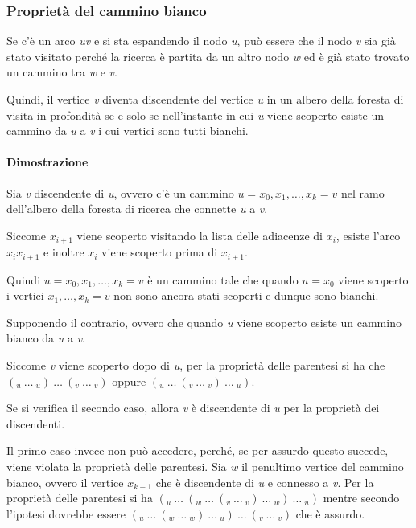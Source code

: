 \subsubsection{Proprietà del cammino bianco}\label{proprietuxe0-del-cammino-bianco}

Se c'è un arco \emph{uv} e si sta espandendo il nodo \emph{u}, può
essere che il nodo \emph{v} sia già stato visitato perché la ricerca è
partita da un altro nodo \emph{w} ed è già stato trovato un cammino tra
\emph{w} e \emph{v}.

Quindi, il vertice \emph{v} diventa discendente del vertice \emph{u} in
un albero della foresta di visita in profondità se e solo se
nell'instante in cui \emph{u} viene scoperto esiste un cammino da
\emph{u} a \emph{v} i cui vertici sono tutti bianchi.

\paragraph{Dimostrazione}\label{dimostrazione-2}

Sia \emph{v} discendente di \emph{u}, ovvero c'è un cammino $u = x_0, x_1, \ldots, x_k = v$ nel ramo dell'albero della foresta di ricerca
che connette \emph{u} a \emph{v}.

Siccome $x_{i+1}$ viene scoperto visitando la lista delle adiacenze di
$x_i$, esiste l'arco $x_ix_{i+1}$ e inoltre $x_i$ viene
scoperto prima di $x_{i+1}$.

Quindi $u = x_0, x_1,\ldots,x_k = v$ è un cammino tale che quando
$u = x_0$ viene scoperto i vertici $x_1,\ldots,x_k = v$ non
sono ancora stati scoperti e dunque sono bianchi.

Supponendo il contrario, ovvero che quando \emph{u} viene scoperto
esiste un cammino bianco da \emph{u} a \emph{v}.

Siccome \emph{v} viene scoperto dopo di \emph{u}, per la proprietà delle
parentesi si ha che  $(_u \: \ldots\: _u) \: \ldots \: (_v \:\ldots \:_v)$ oppure
$(_u \: \ldots \: (_v \: \ldots \:_v) \: \ldots \:_u)$.

Se si verifica il secondo caso, allora \emph{v} è discendente di
\emph{u} per la proprietà dei discendenti.

Il primo caso invece non può accedere, perché, se per assurdo questo
succede, viene violata la proprietà delle parentesi. 
Sia \emph{w} il penultimo vertice del cammino bianco, ovvero il vertice $x_{k-1}$ che
è discendente di \emph{u} e connesso a \emph{v}. Per la proprietà delle
parentesi si ha $(_u \: \ldots \: (_w \: \ldots \: (_v \: \ldots\: _v) \: \ldots \: _w) \: \ldots \: _u)$ mentre secondo l'ipotesi dovrebbe essere 
$(_u \: \ldots \: (_w \: \ldots \: _w) \: \ldots \: _u) \: \ldots \: (_v \: \ldots\: _v)$ che è
assurdo.

